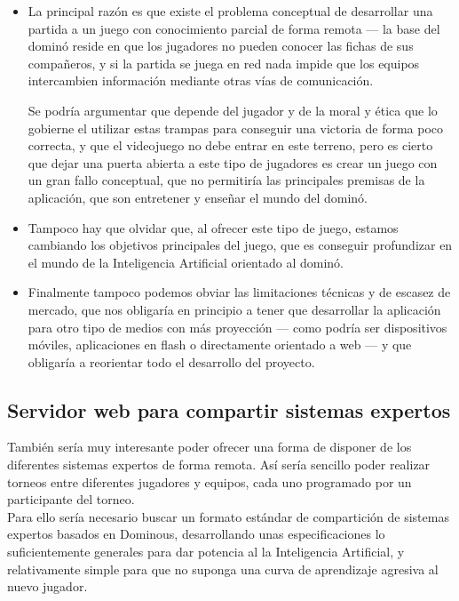 \begin{itemize}
    \item La principal razón es que existe el problema conceptual de desarrollar una partida a un juego con conocimiento parcial 
        de forma remota --- la base del dominó reside en que los jugadores no pueden conocer las fichas de sus compañeros,
        y si la partida se juega en red nada impide que los equipos intercambien información mediante otras vías de
        comunicación.

        Se podría argumentar que depende del jugador y de la moral y ética que lo gobierne el utilizar estas trampas
        para conseguir una victoria de forma poco correcta, y que el videojuego no debe entrar en este terreno, pero
        es cierto que dejar una puerta abierta a este tipo de jugadores es crear un juego con un gran fallo conceptual,
        que no permitiría las principales premisas de la aplicación, que son entretener y enseñar el mundo del dominó.

    \item Tampoco hay que olvidar que, al ofrecer este tipo de juego, estamos cambiando los objetivos principales del
        juego, que es conseguir profundizar en el mundo de la Inteligencia Artificial orientado al dominó.

    \item Finalmente tampoco podemos obviar las limitaciones técnicas y de escasez de mercado, que nos obligaría en
        principio a tener que desarrollar la aplicación para otro tipo de medios con más proyección --- como podría
        ser dispositivos móviles, aplicaciones en flash o directamente orientado a web --- y que obligaría a reorientar
        todo el desarrollo del proyecto.
\end{itemize}

\subsection{Servidor web para compartir sistemas expertos}

También sería muy interesante poder ofrecer una forma de disponer de los diferentes sistemas expertos de forma remota.
Así sería sencillo poder realizar torneos entre diferentes jugadores y equipos, cada uno programado por un participante
del torneo. \\

Para ello sería necesario buscar un formato estándar de compartición de sistemas expertos basados en Dominous, desarrollando
unas especificaciones lo suficientemente generales para dar potencia al la Inteligencia Artificial, y relativamente
simple para que no suponga una curva de aprendizaje agresiva al nuevo jugador. \\

